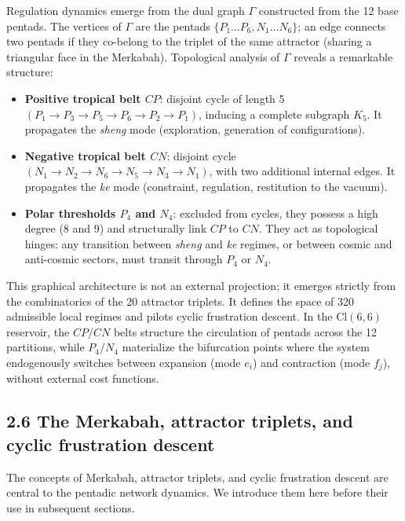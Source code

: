\documentclass[11pt]{article}
\providecommand{\tightlist}{\setlength{\itemsep}{2pt}\setlength{\parskip}{6pt}}
\providecommand{\tightlist}{%
  \setlength{\itemsep}{2pt}\setlength{\parskip}{6pt}
}
\begin{document}
Regulation dynamics emerge from the dual graph \(\Gamma\) constructed
from the 12 base pentads. The vertices of \(\Gamma\) are the pentads
\(\{P_1\dots P_6, N_1\dots N_6\}\); an edge connects two pentads if they
co-belong to the triplet of the same attractor (sharing a triangular
face in the Merkabah). Topological analysis of \(\Gamma\) reveals a
remarkable structure:

\begin{itemize}
\tightlist
\item
  \textbf{Positive tropical belt \(CP\)}: disjoint cycle of length 5
  \((P_1 \to P_3 \to P_5 \to P_6 \to P_2 \to P_1)\), inducing a complete
  subgraph \(K_5\). It propagates the \textit{sheng} mode (exploration,
  generation of configurations).
\item
  \textbf{Negative tropical belt \(CN\)}: disjoint cycle
  \((N_1 \to N_2 \to N_6 \to N_5 \to N_3 \to N_1)\), with two additional
  internal edges. It propagates the \textit{ke} mode (constraint,
  regulation, restitution to the vacuum).
\item
  \textbf{Polar thresholds \(P_4\) and \(N_4\)}: excluded from cycles,
  they possess a high degree (8 and 9) and structurally link \(CP\) to
  \(CN\). They act as topological hinges: any transition between
  \textit{sheng} and \textit{ke} regimes, or between cosmic and
  anti-cosmic sectors, must transit through \(P_4\) or \(N_4\).
\end{itemize}

This graphical architecture is not an external projection; it emerges
strictly from the combinatorics of the 20 attractor triplets. It defines
the space of 320 admissible local regimes and pilots cyclic frustration
descent. In the \(\text{Cl}(6,6)\) reservoir, the \(CP/CN\) belts
structure the circulation of pentads across the 12 partitions, while
\(P_4/N_4\) materialize the bifurcation points where the system
endogenously switches between expansion (mode \(e_i\)) and contraction
(mode \(f_j\)), without external cost functions.

\hypertarget{the-merkabah-attractor-triplets-and-cyclic-frustration-descent}{%
\subsection{2.6 The Merkabah, attractor triplets, and cyclic frustration
descent}\label{the-merkabah-attractor-triplets-and-cyclic-frustration-descent}}

The concepts of Merkabah, attractor triplets, and cyclic frustration
descent are central to the pentadic network dynamics. We introduce them
here before their use in subsequent sections.
\end{document}
